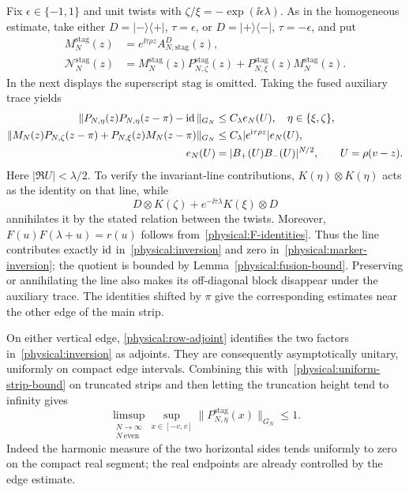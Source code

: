 Fix $\epsilon\in\{-1,1\}$ and unit twists with
$\zeta/\xi=-\exp(\ii\epsilon\lambda)$. As in the homogeneous estimate,
take either $D=|-\rangle\langle+|$, $\tau=\epsilon$, or
$D=|+\rangle\langle-|$, $\tau=-\epsilon$, and put
\begin{align}
 M_N^{\mathrm{stag}}(z)&=
    e^{\ii\tau\rho z}A_{N,\mathrm{stag}}^D(z),\label{physical:marker}\\
 \mathcal N_N^{\mathrm{stag}}(z)&=
 M_N^{\mathrm{stag}}(z)P_{N,\zeta}^{\mathrm{stag}}(z)
 +P_{N,\xi}^{\mathrm{stag}}(z)M_N^{\mathrm{stag}}(z).
 \label{physical:marker-sum}
\end{align}
In the next displays the superscript $\mathrm{stag}$ is omitted.
Taking the fused auxiliary trace yields
\begin{align}
 \|P_{N,\eta}(z)P_{N,\eta}(z-\pi)-\operatorname{id}\|_{G_N}
   &\le C_\lambda e_N(U),\quad \eta\in\{\xi,\zeta\},
   \label{physical:inversion}\\
 \|M_N(z)P_{N,\zeta}(z-\pi)
       +P_{N,\xi}(z)M_N(z-\pi)\|_{G_N}
   &\le C_\lambda |e^{\mathrm i\tau\rho z}|e_N(U),
   \label{physical:marker-inversion}\\
 e_N(U)&=|B_+(U)B_-(U)|^{N/2},\qquad U=\rho(v-z).
 \notag
\end{align}
Here $|\Re U|<\lambda/2$. To verify the invariant-line contributions,
$K(\eta)\otimes K(\eta)$ acts as the identity on that line, while
\[
 D\otimes K(\zeta)+e^{-\ii\tau\lambda}K(\xi)\otimes D
\]
annihilates it by the stated relation between the twists. Moreover,
$F(u)F(\lambda+u)=r(u)$ follows from~\eqref{physical:F-identities}.
Thus the line contributes exactly $\operatorname{id}$ in~\eqref{physical:inversion}
and zero in~\eqref{physical:marker-inversion}; the quotient is bounded by
Lemma~\ref{physical:fusion-bound}. Preserving or annihilating the line
also makes its off-diagonal block disappear under the auxiliary trace.
The identities shifted by $\pi$ give the corresponding estimates near
the other edge of the main strip.

On either vertical edge, \eqref{physical:row-adjoint} identifies the two
factors in~\eqref{physical:inversion} as adjoints. They are consequently
asymptotically unitary, uniformly on compact edge intervals. Combining
this with~\eqref{physical:uniform-strip-bound} on truncated strips and
then letting the truncation height tend to infinity gives
\begin{equation}\label{physical:asymptotic-contraction}
 \limsup_{\substack{N\to\infty\\N\ \mathrm{even}}}
 \sup_{x\in[-v,v]}\|P_{N,\eta}^{\mathrm{stag}}(x)\|_{G_N}\le1.
\end{equation}
Indeed the harmonic measure of the two horizontal sides tends uniformly
to zero on the compact real segment; the real endpoints are already
controlled by the edge estimate.


